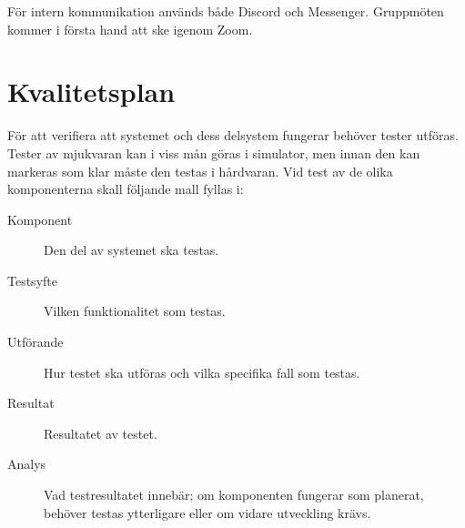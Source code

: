 \documentclass[a4paper]{article}
\begin{document}
För intern kommunikation används både Discord och Messenger. Gruppmöten kommer i första hand att ske igenom Zoom.

\section{Kvalitetsplan}

För att verifiera att systemet och dess delsystem fungerar behöver tester utföras. Tester av mjukvaran kan i viss mån göras i simulator, men innan den kan markeras som klar måste den testas i hårdvaran. Vid test av de olika komponenterna skall följande mall fyllas i:

\begin{description}
\item[Komponent] Den del av systemet ska testas.

\item[Testsyfte] Vilken funktionalitet som testas.

\item[Utförande] Hur testet ska utföras och vilka specifika fall som testas.

\item[Resultat] Resultatet av testet.

\item[Analys] Vad testresultatet innebär; om komponenten fungerar som planerat, behöver testas ytterligare eller om vidare utveckling krävs.
\end{description}




\end{document}
